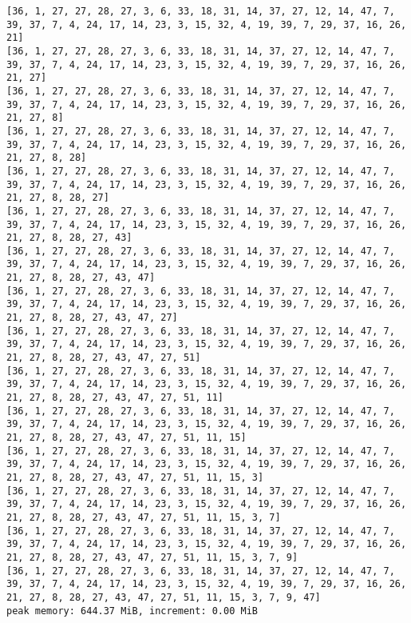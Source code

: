 \documentclass[11pt]{article}
\begin{document}
\begin{Verbatim}[commandchars=\\\{\}]
[36, 1, 27, 27, 28, 27, 3, 6, 33, 18, 31, 14, 37, 27, 12, 14, 47, 7, 39, 37, 7, 4, 24, 17, 14, 23, 3, 15, 32, 4, 19, 39, 7, 29, 37, 16, 26, 21]
[36, 1, 27, 27, 28, 27, 3, 6, 33, 18, 31, 14, 37, 27, 12, 14, 47, 7, 39, 37, 7, 4, 24, 17, 14, 23, 3, 15, 32, 4, 19, 39, 7, 29, 37, 16, 26, 21, 27]
[36, 1, 27, 27, 28, 27, 3, 6, 33, 18, 31, 14, 37, 27, 12, 14, 47, 7, 39, 37, 7, 4, 24, 17, 14, 23, 3, 15, 32, 4, 19, 39, 7, 29, 37, 16, 26, 21, 27, 8]
[36, 1, 27, 27, 28, 27, 3, 6, 33, 18, 31, 14, 37, 27, 12, 14, 47, 7, 39, 37, 7, 4, 24, 17, 14, 23, 3, 15, 32, 4, 19, 39, 7, 29, 37, 16, 26, 21, 27, 8, 28]
[36, 1, 27, 27, 28, 27, 3, 6, 33, 18, 31, 14, 37, 27, 12, 14, 47, 7, 39, 37, 7, 4, 24, 17, 14, 23, 3, 15, 32, 4, 19, 39, 7, 29, 37, 16, 26, 21, 27, 8, 28, 27]
[36, 1, 27, 27, 28, 27, 3, 6, 33, 18, 31, 14, 37, 27, 12, 14, 47, 7, 39, 37, 7, 4, 24, 17, 14, 23, 3, 15, 32, 4, 19, 39, 7, 29, 37, 16, 26, 21, 27, 8, 28, 27, 43]
[36, 1, 27, 27, 28, 27, 3, 6, 33, 18, 31, 14, 37, 27, 12, 14, 47, 7, 39, 37, 7, 4, 24, 17, 14, 23, 3, 15, 32, 4, 19, 39, 7, 29, 37, 16, 26, 21, 27, 8, 28, 27, 43, 47]
[36, 1, 27, 27, 28, 27, 3, 6, 33, 18, 31, 14, 37, 27, 12, 14, 47, 7, 39, 37, 7, 4, 24, 17, 14, 23, 3, 15, 32, 4, 19, 39, 7, 29, 37, 16, 26, 21, 27, 8, 28, 27, 43, 47, 27]
[36, 1, 27, 27, 28, 27, 3, 6, 33, 18, 31, 14, 37, 27, 12, 14, 47, 7, 39, 37, 7, 4, 24, 17, 14, 23, 3, 15, 32, 4, 19, 39, 7, 29, 37, 16, 26, 21, 27, 8, 28, 27, 43, 47, 27, 51]
[36, 1, 27, 27, 28, 27, 3, 6, 33, 18, 31, 14, 37, 27, 12, 14, 47, 7, 39, 37, 7, 4, 24, 17, 14, 23, 3, 15, 32, 4, 19, 39, 7, 29, 37, 16, 26, 21, 27, 8, 28, 27, 43, 47, 27, 51, 11]
[36, 1, 27, 27, 28, 27, 3, 6, 33, 18, 31, 14, 37, 27, 12, 14, 47, 7, 39, 37, 7, 4, 24, 17, 14, 23, 3, 15, 32, 4, 19, 39, 7, 29, 37, 16, 26, 21, 27, 8, 28, 27, 43, 47, 27, 51, 11, 15]
[36, 1, 27, 27, 28, 27, 3, 6, 33, 18, 31, 14, 37, 27, 12, 14, 47, 7, 39, 37, 7, 4, 24, 17, 14, 23, 3, 15, 32, 4, 19, 39, 7, 29, 37, 16, 26, 21, 27, 8, 28, 27, 43, 47, 27, 51, 11, 15, 3]
[36, 1, 27, 27, 28, 27, 3, 6, 33, 18, 31, 14, 37, 27, 12, 14, 47, 7, 39, 37, 7, 4, 24, 17, 14, 23, 3, 15, 32, 4, 19, 39, 7, 29, 37, 16, 26, 21, 27, 8, 28, 27, 43, 47, 27, 51, 11, 15, 3, 7]
[36, 1, 27, 27, 28, 27, 3, 6, 33, 18, 31, 14, 37, 27, 12, 14, 47, 7, 39, 37, 7, 4, 24, 17, 14, 23, 3, 15, 32, 4, 19, 39, 7, 29, 37, 16, 26, 21, 27, 8, 28, 27, 43, 47, 27, 51, 11, 15, 3, 7, 9]
[36, 1, 27, 27, 28, 27, 3, 6, 33, 18, 31, 14, 37, 27, 12, 14, 47, 7, 39, 37, 7, 4, 24, 17, 14, 23, 3, 15, 32, 4, 19, 39, 7, 29, 37, 16, 26, 21, 27, 8, 28, 27, 43, 47, 27, 51, 11, 15, 3, 7, 9, 47]
peak memory: 644.37 MiB, increment: 0.00 MiB

\end{Verbatim}
\end{document}
